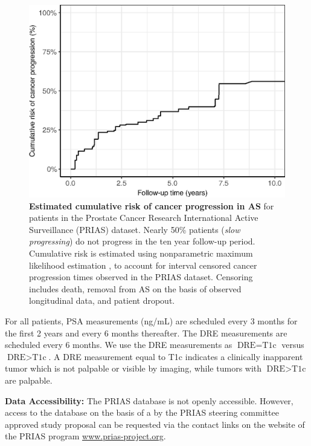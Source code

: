 \begin{figure}[!htb]
\captionsetup{justification=justified}
\centerline{\includegraphics[width=\columnwidth]{images/npmle_plot.eps}}
\caption{\textbf{Estimated cumulative risk of cancer progression in AS} for patients in the Prostate Cancer Research International Active Surveillance (PRIAS) dataset. Nearly 50\% patients (\textit{slow progressing}) do not progress in the ten year follow-up period. Cumulative risk is estimated using nonparametric maximum likelihood estimation \citep{turnbull1976empirical}, to account for interval censored cancer progression times observed in the PRIAS dataset. Censoring includes death, removal from AS on the basis of observed longitudinal data, and patient dropout.}
\label{fig:npmle_plot}
\end{figure}

For all patients, PSA measurements (ng/mL) are scheduled every 3 months for the first 2 years and every 6 months thereafter. The DRE measurements are scheduled every 6 months. We use the DRE measurements as $\mbox{DRE} = \mbox{T1c}$ versus $\mbox{DRE} > \mbox{T1c}$. A DRE measurement equal to T1c \citep{schroder1992tnm} indicates a clinically inapparent tumor which is not palpable or visible by imaging, while tumors with $\mbox{DRE} > \mbox{T1c}$ are palpable.

\textbf{Data Accessibility:} The PRIAS database is not openly accessible. However, access to the database on the basis of a by the PRIAS steering committee approved study proposal can be requested via the contact links on the website of the PRIAS program \url{www.prias-project.org}.

